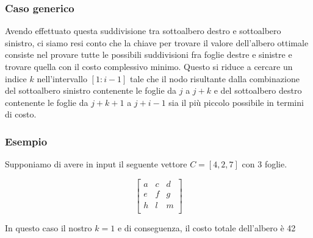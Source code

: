 \subsubsection*{Caso generico}

Avendo effettuato questa suddivisione tra sottoalbero destro e sottoalbero sinistro, ci siamo resi conto che la chiave per trovare il valore dell'albero 
ottimale consiste nel provare tutte le possibili suddivisioni fra foglie destre e sinistre e trovare quella con il costo complessivo minimo. Questo si riduce a 
cercare un indice $k$ nell'intervallo $[1 : i - 1]$ tale che il nodo risultante dalla combinazione del sottoalbero sinistro contenente le foglie da $j$ a $j + k$ e del 
sottoalbero destro contenente le foglie da $j + k +1$ a $j + i - 1$ sia il più piccolo possibile in termini di costo.

\subsubsection*{Esempio}

Supponiamo di avere in input il seguente vettore $C = [4, 2, 7]$ con 3 foglie.

\[
\begin{bmatrix}
  a & c & d \\
  e & f & g \\
  h & l & m \\
\end{bmatrix}
\]

\begin{enumerate*}[label={}]
    \item {
  }
  \newline
  \item{
    In questo caso il nostro $k = 1$ e di conseguenza, il costo totale dell'albero è 42
  }
\end{enumerate*}
\\
\\

